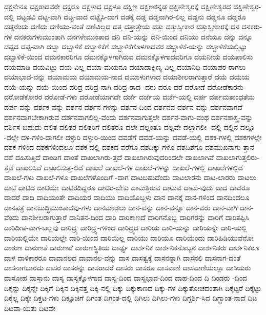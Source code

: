{ದಕ್ಷನೇನೂ
ದಕ್ಷರಾದವರೇ
ದಕ್ಷರೂ
ದಕ್ಷಳಾದ
ದಕ್ಷಳೂ
ದಕ್ಷಿಣ
ದಕ್ಷಿಣಕನ್ನಡ
ದಕ್ಷಿಣೇಶ್ವರಕ್ಕೆ
ದಕ್ಷಿಣೇಶ್ವರದ
ದಕ್ಷಿಣೇಶ್ವರ-ದಲ್ಲಿ
ದಟ್ಟಡವಿ
ದಟ್ಟ-ವಾಗಿ
ದಟ್ಟ-ವಾದ
ದಟ್ಟೈಸಿ-ದಾಗ
ದಡಕ್ಕೆ
ದಡ್ಡ
ದಡ್ಡನಾಗಿರ-ಲಿಲ್ಲ
ದಡ್ಡನು
ದಡ್ಡನೂ
ದಡ್ಡರೂ
ದಡ್ಡರೆಂದು
ದಣಿದು
ದಣಿಯು-ವಂತೆ
ದಣಿವಿಲ್ಲದ
ದತ್ತ
ದತ್ತಾತ್ರೇಯ
ದತ್ತು
ದತ್ತುಸ್ವೀಕಾರ
ದತ್ತುಸ್ವೀಕಾರಕ್ಕೆ
ದನ
ದನಕರು-ಗಳ
ದನಕರುಗಳುಮುಂತಾಗಿ
ದನಗಳೇಮುಂತಾದ
ದನಿ
ದನಿ-ಯನ್ನು
ದನಿ-ಯಿಂದ
ದನಿಯು
ದನೆಯೂ
ದನ್ನು
ದನ್ನೂ
ದಪ್ಪದ
ದಪ್ಪ-ವಾಗಿ
ದಬ್ಬಾ
ದಬ್ಬಾಳಿಕೆ
ದಬ್ಬಾಳಿಕೆಗೆ
ದಬ್ಬಾಳಿಕೆಗೊಳಗಾದವರ
ದಬ್ಬಾಳಿಕೆ-ಯನ್ನು
ದಬ್ಬಾಳಿಕೆಯಲ್ಲಿಟ್ಟು
ದಬ್ಬಾಳಿಕೆ-ಯಿಂದ
ದಮನಕಾರರಿಗೂ
ದಮನಕ್ಕೊಳಗಾಗಿರುವ
ದಮನಕ್ಕೊಳಗಾದವರಿಗೂ
ದಯನೀಯ
ದಯಪಾಲಿಸು
ದಯಮಾಡಿ
ದಯವಿಟ್ಟು
ದಯ-ವಿಲ್ಲ
ದಯಾ-ಮಯನೂ
ದಯಾದಾಕ್ಷಿಣ್ಯ-ವಿಲ್ಲ
ದಯಾನಿಧಿ
ದಯಾಪರ-ರಾಗಲು
ದಯಾಭಾವ-ವನ್ನು
ದಯಾಮಯ
ದಯಾಮಯ-ನಾದ
ದಯಾಳುಗಳಾದ
ದಯಾಶೀಲರಾಗುತ್ತಾರೆ
ದಯೆ
ದಯೆಯ
ದಯೆ-ಯನ್ನು
ದಯೆ-ಯಿಂದ
ದರಿದ್ರ
ದರಿದ್ರ-ನಾಗಿ
ದರಿದ್ರ-ರಾದ
-ದರು
ದರೂ
ದರೆ
ದರೋಡೆ
ದರೋಡೆಕಾರನು
ದರೋಡೆಕೋರರ
ದರೋಡೆ-ಗಳು
ದರೋಡೆಯಾಗದೇ
ದರ್ಜೆ
ದರ್ಜೆಯ
ದರ್ಜೆ-ಯಲ್ಲಿ
ದರ್ಪ
ದರ್ಪಮತಾಂಧತೆಯ
ದರ್ಪ-ವನ್ನು
ದರ್ಶಕ-ವನ್ನು
ದರ್ಶನ
ದರ್ಶನ-ಗಳನ್ನು
ದರ್ಶನ-ದಿಂದ
ದರ್ಶನವ
ದರ್ಶನ-ವನ್ನು
ದರ್ಶನವಾಗದೆ
ದರ್ಶನವಾಗಬೇಕಾಗಿರುವ
ದರ್ಶನವಾಗಲಿಲ್ಲ-ವೆಂದು
ದರ್ಶನವಾಗುತ್ತಲೇ
ದರ್ಶನ-ವಾಗು-ವಂಥ
ದರ್ಶನಶಾಸ್ತ್ರ-ವನ್ನು
ದರ್ಶಿಸ-ಬಹುದು
ದಲಿತ
ದಲಿತರ
ದಲಿತರಿಗೆ
ದಲಿತರೂ
ದಲೇ
ದಲ್ಲಂತೂ
ದಲ್ಲವೇ
ದಲ್ಲಾಗಲೀ
-ದಲ್ಲಿ
ದಲ್ಲಿನ
ದಲ್ಲೂ
-ದಲ್ಲೇ
ದಳ-ಗಳಿಂ-ದಾಗಲೀ
ದಳ್ಳುರಿ
ದಳ್ಳುರಿ-ಯಿಂದ
ದವಡೆಗೆ
ದವಡೆ-ಯನ್ನು
ದವಡೆ-ಯಲ್ಲಿ
ದಶಕ-ಗಳಲ್ಲಿ
ದಶಕಗಳಲ್ಲೇ
ದಶಕ-ಗಳಿಂದ
ದಶಕಗಳಿಂದಲೂ
ದಶಕ-ದಲ್ಲಿ
ದಶಕದ-ವರೆಗೂ
ದಶದಿಕ್ಕು-ಗಳೂ
ದಶದಿಶೆಗೂ
ದಶಮುಖನಾಗು-ತ್ತಾನೆ
ದಶೆ
ದಹಿಸುತ್ತಿದೆ
ದಾಂಡಿಗ
ದಾಂತೆ
ದಾಖಲಾಗಿರು-ತ್ತದೆ
ದಾಖಲಾಗಿರುವುದರಿಂದಲೇ
ದಾಖಲಾಗಿವೆ
ದಾಖಲಾಗುತ್ತಲಿರು-ತ್ತವೆ
ದಾಖಲಿಸಿದೆ
ದಾಖಲಿಸುತ್ತ-ಲಿದೆ
ದಾಖಲೆ
ದಾಖಲೆ-ಗಳ
ದಾಖಲೆ-ಗಳನ್ನು
ದಾಖಲೆ-ಗಳಲ್ಲಿ
ದಾಖಲೆಗಳಲ್ಲಿದೆ
ದಾಖಲೆ-ಗಳು
ದಾಖಲೆ-ಗಳೂ
ದಾಖಲೆಗಳೊಂದಿಗೆ
-ದಾಗ
ದಾಟಬಹುದೆಂದು
ದಾಟಲಾರನು
ದಾಟ-ಲಾರರು
ದಾಟಲು
ದಾಟಿ
ದಾಟಿದ
ದಾಟಿಯೇ
ದಾಟಿರದಿದ್ದರೂ
ದಾಟಿರ-ಬೇಕು
ದಾಟುತ್ತಿರುವ
ದಾಟುವ
ದಾಟು-ವುದು
ದಾದ
ದಾದರೂ
ದಾದರೆ
ದಾದಿ
ದಾದಿಯಂತೇ
ದಾದಿಯರ
ದಾದಿಯು
ದಾದಿಯೊಬ್ಬಳು
ದಾನ
ದಾನಕ್ಕೆ
ದಾನ-ಗಳಿಂದ
ದಾನದಿಂದಲೂ
ದಾನಪತ್ರ
ದಾನಬುದ್ಧಿಮುಂತಾದವು-ಗಳು
ದಾನಮಾಡಲು
ದಾನ-ವನ್ನು
ದಾನ-ವನ್ನೂ
ದಾನ-ವರು
ದಾನ-ವಾಗಿ
ದಾನ-ವೆಂದು
ದಾನಶೀಲರಾಗುತ್ತಾರೆ
ದಾನಿತನ-ದಿಂದ
ದಾರಿ
ದಾರಿಕಾಣದೆ
ದಾರಿಗನೊಬ್ಬ
ದಾರಿಗರನ್ನು
ದಾರಿಗೆ
ದಾರಿತಪ್ಪಿಸಿ
ದಾರಿದೀಪ-ವಾಗ-ಬಲ್ಲವು
ದಾರಿದ್ರ್ಯ
ದಾರಿದ್ರ್ಯ-ಗಳಿಂದ
ದಾರಿದ್ರ್ಯದ
ದಾರಿಯ
ದಾರಿ-ಯನ್ನು
ದಾರಿಯನ್ನೇ
ದಾರಿ-ಯಲ್ಲಿ
ದಾರಿಯಲ್ಲಿಯೇ
ದಾರಿಯಲ್ಲೇ
ದಾರಿ-ಯಿಂದ
ದಾರಿಯಿಲ್ಲ
ದಾರಿಯು
ದಾರಿಯೂ
ದಾರಿಯೆಂದು
ದಾರಿಹಿಡಿಯುವೆನೋ
ದಾರುಣ
ದಾರುಣತೆ
ದಾರುಣವೆ
ದಾರುಣಸ್ಥಿತಿಯ
ದಾರ್ಢ್ಯ
ದಾರ್ಶನಿಕ
ದಾರ್ಶನಿಕನೊಬ್ಬನ
ದಾರ್ಶನಿಕರು
ದಾರ್ಶನಿಕರೂ
ದಾಳ
ದಾಳಿಕಾರರೂ
ದಾವಾನಲದ
ದಾವಾನಲ-ವನ್ನು
ದಾಸ
ದಾಸತ್ವಕ್ಕೆ
ದಾಸನನ್ನಾಗಿ
ದಾಸನಲಿ
ದಾಸನಾಗ-ದಂತೆ
ದಾಸನಾಗಬಾರದು
ದಾಸರ
ದಾಸರನ್ನು
ದಾಸರಾದರೆ
ದಾಸರು
ದಾಸರೂ
ದಾಸವಾಣಿ
ದಾಸವಾಣಿಯಲ್ಲೂ
ದಾಸಿಯರು
ದಾಸೋಹ
ದಾಸ್ತಾನು
ದಾಸ್ಯ
ದಾಸ್ಯಕ್ಕೊಳಗಾದ
ದಾಸ್ಯ-ದಿಂದ
ದಾಸ್ಯಭಾವ-ದಿಂದ
ದಾಹ-ದಿಂದ
ದಿ
ದಿಂಡರು
-ದಿಂದ
ದಿಕ್ಕನ್ನು
ದಿಕ್ಕನ್ನೇ
ದಿಕ್ಕಿಗೆ
ದಿಕ್ಕಿನ
ದಿಕ್ಕಿನತ್ತ
ದಿಕ್ಕಿ-ನಲ್ಲಿ
ದಿಕ್ಕು
ದಿಕ್ಕುಕಾಣದ
ದಿಕ್ಕು-ಗಳ
ದಿಕ್ಕುತೋಚದಂತಾಗಿ
ದಿಕ್ಕೆಟ್ಟರೆ
ದಿಕ್ಕೆಟ್ಟು
ದಿಕ್ಕೆಲ್ಲ
ದಿಕ್ಕೇ
ದಿಕ್ತಟ-ಗಳು
ದಿಕ್ಸೂಚಿಗೆ
ದಿಗಂತ
ದಿಗಂತ-ದಲ್ಲಿ
ದಿಗಿಲು
ದಿಗಿಲು-ಗಳು
ದಿಗ್ದರ್ಶಿ-ಸಿದ
ದಿಗ್ಭ್ರಾಂತ-ನಾದೆ
ದಿಟ
ದಿಟವಾ-ಯಿತು
ದಿಟವೇ
}
